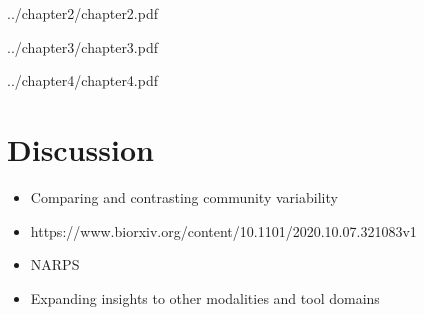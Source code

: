 \documentclass[fleqn,12pt]{SelfArx} %
\newcounter{secnonum}
\newcounter{supsec}
\begin{document}
{}

     {../chapter2/chapter2.pdf}
\clearpage

{}

     {../chapter3/chapter3.pdf}

{}

     {../chapter4/chapter4.pdf}
\twocolumn



\section{Discussion}
\begin{itemize}
\item Comparing and contrasting community variability
\item https://www.biorxiv.org/content/10.1101/2020.10.07.321083v1
\item NARPS
\item Expanding insights to other modalities and tool domains
\end{itemize}
\end{document}
